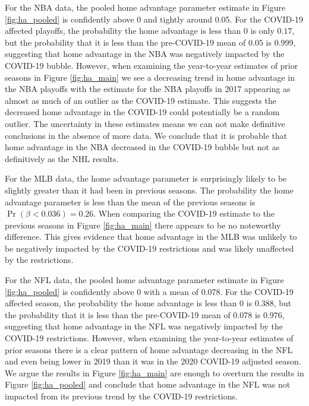 For the NBA data, the pooled home advantage parameter estimate in Figure \mbox{\ref{fig:ha_pooled}} is confidently above 0 and tightly around 0.05. For the COVID-19 affected playoffs, the probability the home advantage is less than 0 is only $0.17$, but the probability that it is less than the pre-COVID-19 mean of 0.05 is $0.999$, suggesting that home advantage in the NBA was negatively impacted by the COVID-19 bubble. However, when examining the year-to-year estimates of prior seasons in Figure \mbox{\ref{fig:ha_main}} we see a decreasing trend in home advantage in the NBA playoffs with the estimate for the NBA playoffs in 2017 appearing as almost as much of an outlier as the COVID-19 estimate. This suggests the decreased home advantage in the COVID-19 could potentially be a random outlier. The uncertainty in these estimates means we can not make definitive conclusions in the absence of more data. We conclude that it is probable that home advantage in the NBA decreased in the COVID-19 bubble but not as definitively as the NHL results.

For the MLB data, the home advantage parameter is surprisingly likely to be slightly greater than it had been in previous seasons. The probability the home advantage parameter is less than the mean of the previous seasons is $\Pr(\beta < 0.036) = 0.26$. When comparing the COVID-19 estimate to the previous seasons in Figure \mbox{\ref{fig:ha_main}} there appears to be no noteworthy difference. This gives evidence that home advantage in the MLB was unlikely to be negatively impacted by the COVID-19 restrictions and was likely unaffected by the restrictions.

For the NFL data, the pooled home advantage parameter estimate in Figure \mbox{\ref{fig:ha_pooled}} is confidently above 0 with a mean of 0.078. For the COVID-19 affected season, the probability the home advantage is less than 0 is $0.388$, but the probability that it is less than the pre-COVID-19 mean of 0.078 is $0.976$, suggesting that home advantage in the NFL was negatively impacted by the COVID-19 restrictions. However, when examining the year-to-year estimates of prior seasons there is a clear pattern of home advantage decreasing in the NFL and even being lower in 2019 than it was in the 2020 COVID-19 adjusted season. We argue the results in Figure \mbox{\ref{fig:ha_main}} are enough to overturn the results in Figure \mbox{\ref{fig:ha_pooled}} and conclude that home advantage in the NFL was not impacted from its previous trend by the COVID-19 restrictions.

